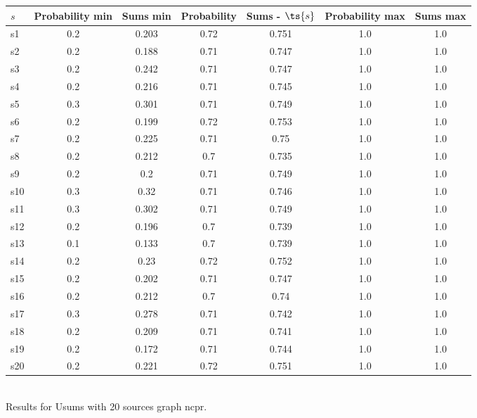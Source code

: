 \documentclass{article}
\begin{document}
\noindent\begin{tabular}{|l|c|c|c|c|c|c|}
\hline
$s$& Probability min & Sums min & Probability & Sums - $\ts{s}$ & Probability max & Sums max\\
\hline
s1 &0.2 & 0.203 & 0.72 & 0.751 & 1.0 & 1.0\\
\hline
s2 &0.2 & 0.188 & 0.71 & 0.747 & 1.0 & 1.0\\
\hline
s3 &0.2 & 0.242 & 0.71 & 0.747 & 1.0 & 1.0\\
\hline
s4 &0.2 & 0.216 & 0.71 & 0.745 & 1.0 & 1.0\\
\hline
s5 &0.3 & 0.301 & 0.71 & 0.749 & 1.0 & 1.0\\
\hline
s6 &0.2 & 0.199 & 0.72 & 0.753 & 1.0 & 1.0\\
\hline
s7 &0.2 & 0.225 & 0.71 & 0.75 & 1.0 & 1.0\\
\hline
s8 &0.2 & 0.212 & 0.7 & 0.735 & 1.0 & 1.0\\
\hline
s9 &0.2 & 0.2 & 0.71 & 0.749 & 1.0 & 1.0\\
\hline
s10 &0.3 & 0.32 & 0.71 & 0.746 & 1.0 & 1.0\\
\hline
s11 &0.3 & 0.302 & 0.71 & 0.749 & 1.0 & 1.0\\
\hline
s12 &0.2 & 0.196 & 0.7 & 0.739 & 1.0 & 1.0\\
\hline
s13 &0.1 & 0.133 & 0.7 & 0.739 & 1.0 & 1.0\\
\hline
s14 &0.2 & 0.23 & 0.72 & 0.752 & 1.0 & 1.0\\
\hline
s15 &0.2 & 0.202 & 0.71 & 0.747 & 1.0 & 1.0\\
\hline
s16 &0.2 & 0.212 & 0.7 & 0.74 & 1.0 & 1.0\\
\hline
s17 &0.3 & 0.278 & 0.71 & 0.742 & 1.0 & 1.0\\
\hline
s18 &0.2 & 0.209 & 0.71 & 0.741 & 1.0 & 1.0\\
\hline
s19 &0.2 & 0.172 & 0.71 & 0.744 & 1.0 & 1.0\\
\hline
s20 &0.2 & 0.221 & 0.72 & 0.751 & 1.0 & 1.0\\
\hline
\end{tabular}\\

\noindent Results for Usums with 20 sources graph ncpr.
\end{document}
